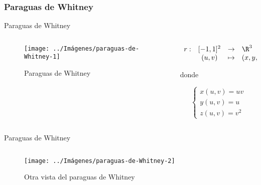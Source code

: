 \documentclass[10pt]{beamer}
\begin{document}
	\subsubsection{Paraguas de Whitney}
	
	\begin{frame}{Paraguas de Whitney}
		\begin{columns}[t] %
			\begin{column}{.50\textwidth}
				\begin{figure}
					\centering
					\texttt{[image: ../Imágenes/paraguas-de-Whitney-1]}
					\caption{Paraguas de Whitney}
					\label{fig:paraguas-de-Whitney-1}
				\end{figure}
			\end{column}%
			\hfill%
			\begin{column}{.50\textwidth}
				$$\begin{array}{rcll}
				r : & [-1, 1]^2 & \to & \R^3\\
				& (u,v) & \mapsto & (x,y,z)
				\end{array}$$
				
				donde 
				
				$$ \begin{cases}
				x(u,v) = uv \\
				y(u,v) = u \\
				z(u,v) = v^2
				\end{cases} $$
			\end{column}%
		\end{columns}
	\end{frame}
	
	\begin{frame}{Paraguas de Whitney}
		\begin{columns}[t] %
			\begin{column}{.50\textwidth}
				\begin{figure}
					\centering
					\texttt{[image: ../Imágenes/paraguas-de-Whitney-2]}
					\caption{Otra vista del paraguas de Whitney}
					\label{fig:paraguas-de-Whitney-2}
				\end{figure}
			\end{column}%
			\hfill%
			\begin{column}{.50\textwidth}
			\end{column}%
		\end{columns}
	\end{frame}
	
\end{document}
